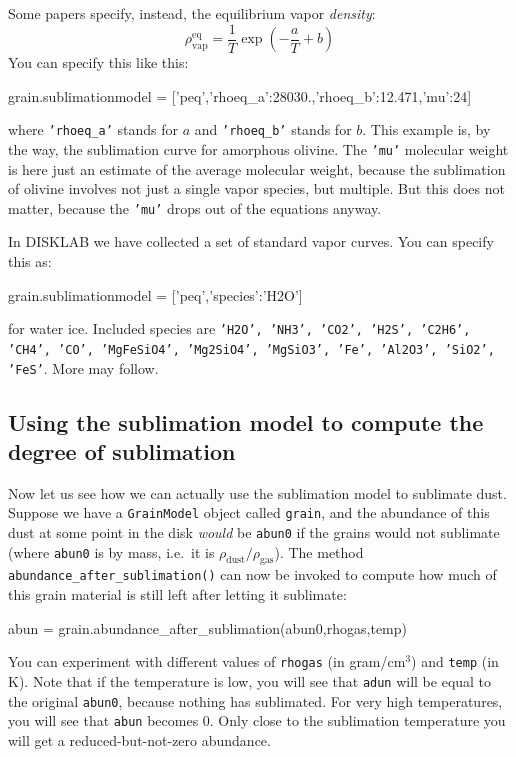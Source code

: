 \documentclass{book}
\newcommand{\code}[1]{{\small\tt #1}}
\begin{document}
Some papers specify, instead, the equilibrium vapor {\em density}:
\begin{equation}
\rho^{\mathrm{eq}}_{\mathrm{vap}} = \frac{1}{T}\exp\left(-\frac{a}{T}+b\right)
\end{equation}
You can specify this like this:
\begin{codebox}
grain.sublimationmodel = ['peq',{'rhoeq_a':28030.,'rhoeq_b':12.471,'mu':24}]
\end{codebox}
where \code{'rhoeq\_a'} stands for $a$ and \code{'rhoeq\_b'} stands for $b$.  This
example is, by the way, the sublimation curve for amorphous olivine.  The
\code{'mu'} molecular weight is here just an estimate of the average molecular
weight, because the sublimation of olivine involves not just a single vapor
species, but multiple. But this does not matter, because the \code{'mu'} drops
out of the equations anyway.

In {\sf DISKLAB} we have collected a set of standard vapor curves. You can
specify this as:
\begin{codebox}
grain.sublimationmodel = ['peq',{'species':'H2O'}]
\end{codebox}
for water ice. Included species are \code{'H2O', 'NH3', 'CO2', 'H2S', 'C2H6', 'CH4',
'CO', 'MgFeSiO4', 'Mg2SiO4', 'MgSiO3', 'Fe', 'Al2O3', 'SiO2', 'FeS'}. More may
follow.


\subsection{Using the sublimation model to compute the degree of sublimation}
\label{subsec-abundance-after-sublimation}
%
Now let us see how we can actually use the sublimation model to sublimate
dust. Suppose we have a \code{GrainModel} object called \code{grain}, and the
abundance of this dust at some point in the disk {\em would} be \code{abun0} if
the grains would not sublimate (where \code{abun0} is by mass, i.e.\ it is
$\rho_{\mathrm{dust}}/\rho_{\mathrm{gas}}$).  The method
\code{abundance\_after\_sublimation()} can now be invoked to compute how much of
this grain material is still left after letting it sublimate:
\begin{codebox}
abun = grain.abundance_after_sublimation(abun0,rhogas,temp)
\end{codebox}
You can experiment with different values of \code{rhogas} (in
gram/cm$^3$) and \code{temp} (in K). Note that if the temperature is low, you
will see that \code{adun} will be equal to the original \code{abun0}, because
nothing has sublimated. For very high temperatures, you will see that
\code{abun} becomes 0. Only close to the sublimation temperature you will get a
reduced-but-not-zero abundance.
\end{document}
